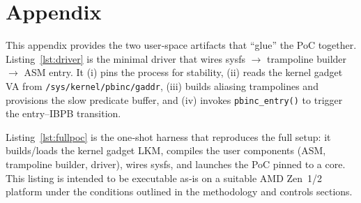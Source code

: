 \documentclass[11pt,a4paper]{article}
\begin{document}


\section{Appendix}
This appendix provides the two user‑space artifacts that “glue” the PoC together. 
Listing~\ref{lst:driver} is the minimal driver that wires sysfs $\rightarrow$ 
trampoline builder $\rightarrow$ ASM entry. It (i) pins the process for stability, 
(ii) reads the kernel gadget VA from \texttt{/sys/kernel/pbinc/gaddr}, 
(iii) builds aliasing trampolines and provisions the slow predicate buffer, and 
(iv) invokes \texttt{pbinc\_entry()} to trigger the entry–IBPB transition.

Listing~\ref{lst:fullpoc} is the one‑shot harness that reproduces the full setup: 
it builds/loads the kernel gadget LKM, compiles the user components (ASM, trampoline 
builder, driver), wires sysfs, and launches the PoC pinned to a core. This listing is 
intended to be executable as‑is on a suitable AMD Zen~1/2 platform under the conditions 
outlined in the methodology and controls sections.
\end{document}
